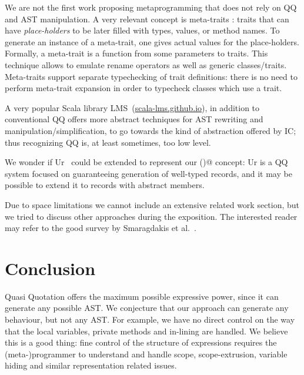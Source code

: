We are not the first work proposing metaprogramming that does not rely on QQ and AST manipulation.
A very relevant concept is meta-traits \cite{reppy2007metaprogramming}:
 traits that can have \emph{place-holders} to be later filled with types, 
values, or method names.
To generate an instance of a meta-trait, one 
gives actual values for the place-holders. 
Formally, a meta-trait is a function from some parameters to traits.
This technique allows to emulate rename operators as well as generic classes/traits.
Meta-traits support separate typechecking of trait definitions:  there is no need to perform meta-trait expansion
 in order to typecheck classes which use a trait.

A very popular Scala library LMS~(\url{scala-lms.github.io}), in addition to conventional QQ offers
more abstract techniques for AST rewriting and manipulation/simplification,
to go towards the kind of abstraction offered by IC;
thus recognizing QQ is, at least sometimes, too low level.

We wonder if Ur~\cite{chlipala2010ur} could be extended to represent our \Q@inductive()@ concept:
Ur is a QQ system focused on guaranteeing generation of well-typed records,
and it may be possible to extend it to records with abstract members.

Due to space limitations we cannot include an extensive related work section,
but we tried to discuss other approaches during the exposition.
The interested reader may refer to the good survey by Smaragdakis et al.~\cite{smaragdakis2015structured}.

\section{Conclusion}


Quasi Quotation offers the maximum possible expressive power, since it can generate any possible AST.
We conjecture that our approach can generate any behaviour, but not any AST.
For example, we have no direct control on the way that the local variables, private methods 
and in-lining are handled.
We believe this is a good thing: fine control of the structure of expressions requires
the (meta-)programmer to understand and handle scope, scope-extrusion, variable hiding and similar
representation related issues.


